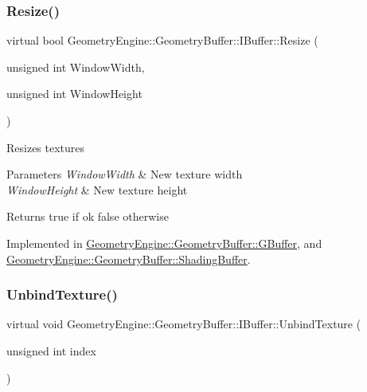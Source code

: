 \mbox{\label{class_geometry_engine_1_1_geometry_buffer_1_1_i_buffer_a3b764e340ccb06bee072d1bd95b007df}} 
\subsubsection{\texorpdfstring{Resize()}{Resize()}}
{\footnotesize\ttfamily virtual bool Geometry\+Engine\+::\+Geometry\+Buffer\+::\+I\+Buffer\+::\+Resize (\begin{DoxyParamCaption}\item[{unsigned int}]{Window\+Width,  }\item[{unsigned int}]{Window\+Height }\end{DoxyParamCaption})\hspace{0.3cm}{\ttfamily [pure virtual]}}

Resizes textures 
\begin{DoxyParams}{Parameters}
{\em Window\+Width} & New texture width \\
\hline
{\em Window\+Height} & New texture height \\
\hline
\end{DoxyParams}
\begin{DoxyReturn}{Returns}
true if ok false otherwise 
\end{DoxyReturn}


Implemented in \mbox{\hyperlink{class_geometry_engine_1_1_geometry_buffer_1_1_g_buffer_a487fb4fb346b34e5fa4a994e97211bab}{Geometry\+Engine\+::\+Geometry\+Buffer\+::\+G\+Buffer}}, and \mbox{\hyperlink{class_geometry_engine_1_1_geometry_buffer_1_1_shading_buffer_a154d3f1ba318675149ebac34471e0aec}{Geometry\+Engine\+::\+Geometry\+Buffer\+::\+Shading\+Buffer}}.

\mbox{\label{class_geometry_engine_1_1_geometry_buffer_1_1_i_buffer_a6130240d58d277cb9e897dfd1924613e}} 
\subsubsection{\texorpdfstring{UnbindTexture()}{UnbindTexture()}\hspace{0.1cm}{\footnotesize\ttfamily [1/2]}}
{\footnotesize\ttfamily virtual void Geometry\+Engine\+::\+Geometry\+Buffer\+::\+I\+Buffer\+::\+Unbind\+Texture (\begin{DoxyParamCaption}\item[{unsigned int}]{index }\end{DoxyParamCaption})\hspace{0.3cm}{\ttfamily [pure virtual]}}

